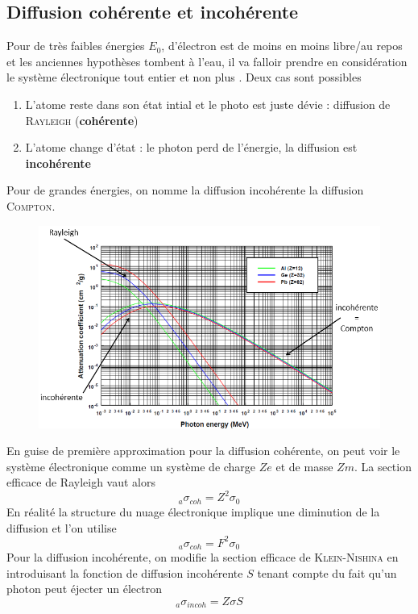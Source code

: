 \subsection{Diffusion cohérente et incohérente}%

Pour de très faibles énergies $E_0$, d'électron est de moins en moins libre/au repos et les anciennes 
hypothèses tombent à l'eau, il va falloir prendre en considération le système électronique tout
entier et non plus . Deux cas sont possibles
\begin{enumerate}
\item L'atome reste dans son état intial et le photo est juste dévie : diffusion de 
\textsc{Rayleigh} (\textbf{cohérente})
\item L'atome change d'état : le photon perd de l'énergie, la diffusion est \textbf{incohérente}
\end{enumerate}
Pour de grandes énergies, on nomme la diffusion incohérente la diffusion \textsc{Compton}.\\

	\begin{figure}
	\vspace{-5mm}
	\includegraphics[scale=0.5]{ch4/image6}
	\end{figure}
	
En guise de première approximation pour la diffusion cohérente, on peut voir le système électronique
comme un système de charge $Ze$ et de masse $Zm$. La section efficace de Rayleigh vaut alors
\begin{equation}
_a\sigma_{coh}=Z^2\sigma_0
\end{equation}
En réalité la structure du nuage électronique implique une diminution de la diffusion et l'on utilise
\begin{equation}
_a\sigma_{coh}=F^2\sigma_0
\end{equation}
Pour la diffusion incohérente, on modifie la section efficace de \textsc{Klein-Nishina} en 
introduisant la fonction de diffusion incohérente $S$ tenant compte du fait qu'un 
photon peut éjecter un électron
\begin{equation}
_a\sigma_{incoh}=Z\sigma S
\end{equation}


